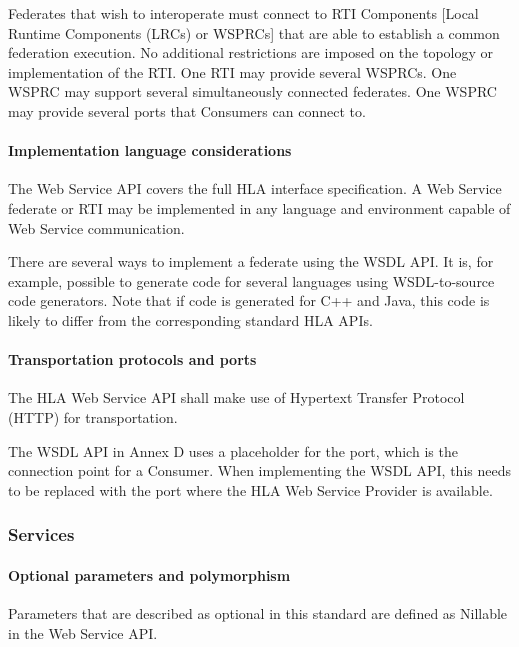 \begin{compactstdpage}
    Federates that wish to interoperate must connect to RTI Components [Local Runtime Components (LRCs) or WSPRCs] that are able to establish a common federation execution. No additional restrictions are imposed on the topology or implementation of the RTI. One RTI may provide several WSPRCs. One WSPRC may support several simultaneously connected federates. One WSPRC may provide several ports that Consumers can connect to.

    \paragraph{Implementation language considerations}

    The Web Service API covers the full HLA interface specification. A Web Service federate or RTI may be implemented in any language and environment capable of Web Service communication.

    There are several ways to implement a federate using the WSDL API. It is, for example, possible to generate code for several languages using WSDL-to-source code generators. Note that if code is generated for C++ and Java, this code is likely to differ from the corresponding standard HLA APIs.

    \paragraph{Transportation protocols and ports}

    The HLA Web Service API shall make use of Hypertext Transfer Protocol (HTTP) for transportation.

    The WSDL API in Annex D uses a placeholder for the port, which is the connection point for a Consumer. When implementing the WSDL API, this needs to be replaced with the port where the HLA Web Service Provider is available.

    \subsubsection{Services}

    \paragraph{Optional parameters and polymorphism}

    Parameters that are described as optional in this standard are defined as Nillable in the Web Service API.


\end{compactstdpage}
